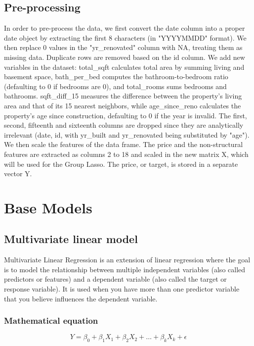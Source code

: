 \documentclass[a4paper, 8pt]{article}
\begin{document}
\begin{multicols}{2}
\subsection{Pre-processing}
In order to pre-process the data, we first convert the date column into a proper date object by extracting the first 8 characters (in "YYYYMMDD" format). We then replace 0 values in the "yr{\_}renovated" column with NA, treating them as missing data. Duplicate rows are removed based on the id column.
We add new variables in the dataset: total{\_}sqft calculates total area by summing living and basement space, bath{\_}per{\_}bed computes the bathroom-to-bedroom ratio (defaulting to 0 if bedrooms are 0), and total{\_}rooms sums bedrooms and bathrooms. sqft{\_}diff{\_}15 measures the difference between the property’s living area and that of its 15 nearest neighbors, while age{\_}since{\_}reno calculates the property’s age since construction, defaulting to 0 if the year is invalid.
The first, second, fifteenth and sixteenth columns are dropped since they are analytically irrelevant (date, id, with yr{\_}built and yr{\_}renovated being substituted by "age"). We then scale the features of the data frame.
The price and the non-structural features are extracted as columns 2 to 18 and scaled in the new matrix X, which will be used for the Group Lasso. The price, or target, is stored in a separate vector Y.

\section{Base Models}
\subsection{Multivariate linear model}
Multivariate Linear Regression is an extension of linear regression where the goal is to model the relationship between multiple independent variables (also called predictors or features) and a dependent variable (also called the target or response variable). It is used when you have more than one predictor variable that you believe influences the dependent variable. \newpage
\subsubsection*{Mathematical equation}
\begin{equation}
Y=\beta_0+\beta_1X_1+\beta_2X_2+\dots+\beta_kX_k+\epsilon
\end{equation}


\end{multicols}
\end{document}
